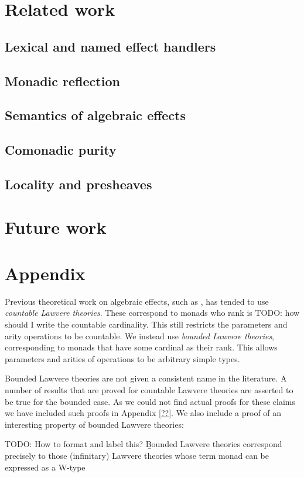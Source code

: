 \documentclass[acmsmall, screen, nonacm]{acmart}
\theoremstyle{definition}
\newcommand{\todo}[1]{{\color{red}TODO: #1}}
\begin{document}
\section{Related work}
\label{sec:related-work}

\subsection{Lexical and named effect handlers}

\subsection{Monadic reflection}

\subsection{Semantics of algebraic effects}

\subsection{Comonadic purity}

\subsection{Locality and presheaves}

\section{Future work}
\label{sec:future-work}






\section{Appendix}

Previous theoretical work on algebraic effects, such as \cite{??},
has tended to use \emph{countable Lawvere theories}. These correspond to
monads who rank is \todo{how should I write the countable
  cardinality}. This still restricts the parameters and arity operations
to be countable. We instead use \emph{bounded Lawvere
  theories}, corresponding to monads that have some cardinal as their
rank. This allows parameters and arities of operations to be arbitrary
simple types.

Bounded Lawvere theories are not given a consistent name in the
literature. A number of results that are proved for countable Lawvere
theories are asserted to be true for the bounded case. As we could not
find actual proofs for these claims we have included such proofs in
Appendix \ref{??}. We also include a proof of an interesting property
of bounded Lawvere theories:

\todo{How to format and label this?}  {\b Bounded Lawvere theories
  correspond precisely to those (infinitary) Lawvere theories whose
  term monad can be expressed as a W-type}
\end{document}
